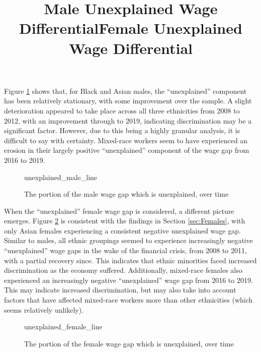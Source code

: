 \documentclass[class=article, crop=false]{standalone}
\begin{document}
Figure \ref{fig:unexplained_male_line} shows that, for Black and Asian males, the \enquote{unexplained} component has been relatively stationary, with some improvement over the sample. A slight deterioration appeared to take place across all three ethnicities from 2008 to 2012, with an improvement through to 2019, indicating discrimination may be a significant factor. However, due to this being a highly granular analysis, it is difficult to say with certainty. Mixed-race workers seem to have experienced an erosion in their largely positive \enquote{unexplained} component of the wage gap from 2016 to 2019.

\begin{figure}[h]
\centering
    \title{Male Unexplained Wage Differential}
    {unexplained_male_line}
    \caption{The portion of the male wage gap which is unexplained, over time}
    \label{fig:unexplained_male_line}
\end{figure}

When the \enquote{unexplained} female wage gap is considered, a different picture emerges. Figure \ref{fig:unexplained_female_line} is consistent with the findings in Section \ref{sec:Females}, with only Asian females experiencing a consistent negative unexplained wage gap. Similar to males, all ethnic groupings seemed to experience increasingly negative \enquote{unexplained} wage gaps in the wake of the financial crisis, from 2008 to 2011, with a partial recovery since. This indicates that ethnic minorities faced increased discrimination as the economy suffered. Additionally, mixed-race females also experienced an increasingly negative \enquote{unexplained} wage gap from 2016 to 2019. This may indicate increased discrimination, but may also take into account factors that have affected mixed-race workers more than other ethnicities (which seems relatively unlikely).

\begin{figure}[h]
\centering
    \title{Female Unexplained Wage Differential}
    {unexplained_female_line}
    \caption{The portion of the female wage gap which is unexplained, over time}
    \label{fig:unexplained_female_line}
\end{figure}



\ifstandalone

\fi
\end{document}

